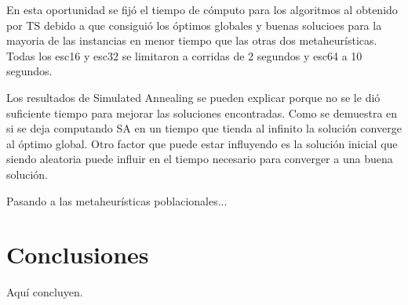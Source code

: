 \documentclass{ci5652}
\begin{document}
En esta oportunidad se fijó el tiempo de cómputo para los algoritmos al obtenido por TS debido a que consiguió los óptimos globales y buenas solucioes para la mayoria de las instancias en menor tiempo que las otras dos metaheurísticas. Todas los esc16 y esc32 se limitaron a corridas de 2 segundos y esc64 a 10 segundos.

Los resultados de Simulated Annealing se pueden explicar porque no se le dió suficiente tiempo para mejorar las soluciones encontradas. Como se demuestra en \cite{7} si se deja computando SA en un tiempo que tienda al infinito la solución converge al óptimo global. Otro factor que puede estar influyendo es la solución inicial que siendo aleatoria puede influir en el tiempo necesario para converger a una buena solución.

Pasando a las metaheurísticas poblacionales...

\section*{Conclusiones}

Aquí concluyen.


\small

\end{document}
